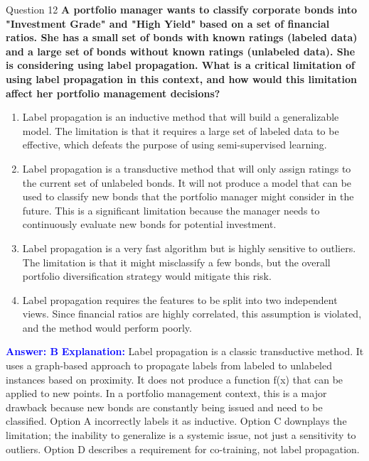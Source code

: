 \documentclass{beamer}
\begin{document}
	\begin{frame}{Question 12}
		\textbf{A portfolio manager wants to classify corporate bonds into "Investment Grade" and "High Yield" based on a set of financial ratios. She has a small set of bonds with known ratings (labeled data) and a large set of bonds without known ratings (unlabeled data). She is considering using label propagation. What is a critical limitation of using label propagation in this context, and how would this limitation affect her portfolio management decisions?}
		\begin{enumerate}
			\item Label propagation is an inductive method that will build a generalizable model. The limitation is that it requires a large set of labeled data to be effective, which defeats the purpose of using semi-supervised learning.
			\item Label propagation is a transductive method that will only assign ratings to the current set of unlabeled bonds. It will not produce a model that can be used to classify new bonds that the portfolio manager might consider in the future. This is a significant limitation because the manager needs to continuously evaluate new bonds for potential investment.
			\item Label propagation is a very fast algorithm but is highly sensitive to outliers. The limitation is that it might misclassify a few bonds, but the overall portfolio diversification strategy would mitigate this risk.
			\item Label propagation requires the features to be split into two independent views. Since financial ratios are highly correlated, this assumption is violated, and the method would perform poorly.
		\end{enumerate}
		\vspace{0.2cm}
		\textcolor{blue}{\textbf{Answer: B}}
		\vspace{0.2cm}
		\textcolor{blue}{\textbf{Explanation:}} Label propagation is a classic transductive method. It uses a graph-based approach to propagate labels from labeled to unlabeled instances based on proximity. It does not produce a function f(x) that can be applied to new points. In a portfolio management context, this is a major drawback because new bonds are constantly being issued and need to be classified. Option A incorrectly labels it as inductive. Option C downplays the limitation; the inability to generalize is a systemic issue, not just a sensitivity to outliers. Option D describes a requirement for co-training, not label propagation.
	\end{frame}
	
\end{document}
